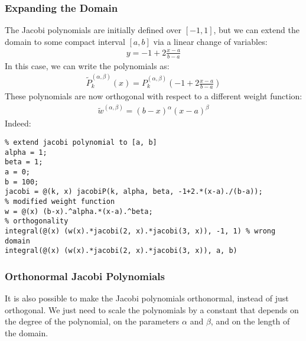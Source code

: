 \documentclass[12pt, a4paper]{article}
\begin{document}
\subsubsection{Expanding the Domain}
\label{sec:orgfe2f8f7}
The Jacobi polynomials are initially defined over \([-1, 1]\), but we can extend the domain to some compact interval \([a, b]\) via a linear change of variables:
\begin{align*}
y = -1 + 2\frac{x-a}{b-a}
\end{align*}
In this case, we can write the polynomials as:
\begin{align*}
\tilde{P}_k^{(\alpha, \beta)}(x) = P_k^{(\alpha, \beta)}\left(-1 + 2\frac{x-a}{b-a}\right)
\end{align*}
These polynomials are now orthogonal with respect to a different weight function:
\begin{align*}
\tilde{w}^{(\alpha, \beta)} = (b-x)^{\alpha}(x-a)^{\beta}
\end{align*}
Indeed:
\lstset{language=matlab,label= ,caption= ,captionpos=b,firstnumber=1,numbers=left,style=Matlab-editor}
\begin{lstlisting}
% extend jacobi polynomial to [a, b]
alpha = 1;
beta = 1;
a = 0;
b = 100;
jacobi = @(k, x) jacobiP(k, alpha, beta, -1+2.*(x-a)./(b-a));
% modified weight function
w = @(x) (b-x).^alpha.*(x-a).^beta;
% orthogonality
integral(@(x) (w(x).*jacobi(2, x).*jacobi(3, x)), -1, 1) % wrong domain
integral(@(x) (w(x).*jacobi(2, x).*jacobi(3, x)), a, b)
\end{lstlisting}
\subsubsection{Orthonormal Jacobi Polynomials}
\label{sec:org3f85b13}
It is also possible to make the Jacobi polynomials orthonormal, instead of just orthogonal.
We just need to scale the polynomials by a constant that depends on the degree of the polynomial, on the parameters \(\alpha\) and \(\beta\), and on the length of the domain.
\end{document}
